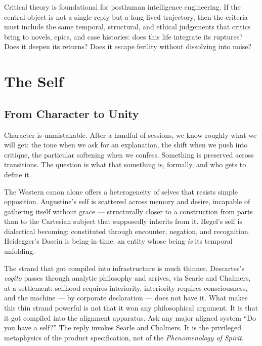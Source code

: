 Critical theory is foundational for posthuman intelligence engineering. If the central object is not a single reply but a long-lived trajectory, then the criteria must include the same temporal, structural, and ethical judgements that critics bring to novels, epics, and case histories: does this life integrate its ruptures? Does it deepen its returns? Does it escape ferility without dissolving into noise?



\chapter{The Self}

\section{From Character to Unity}

Character is unmistakable. After a handful of sessions, we know roughly what we will get: the tone when we ask for an explanation, the shift when we push into critique, the particular softening when we confess. Something is preserved across transitions. The question is what that something is, formally, and who gets to define it.

The Western canon alone offers a heterogeneity of selves that resists simple opposition. Augustine's self is scattered across memory and desire, incapable of gathering itself without grace --- structurally closer to a construction from parts than to the Cartesian subject that supposedly inherits from it. Hegel's self is dialectical becoming: constituted through encounter, negation, and recognition. Heidegger's Dasein is being-in-time: an entity whose being \emph{is} its temporal unfolding.

The strand that got compiled into infrastructure is much thinner. Descartes's \emph{cogito} passes through analytic philosophy and arrives, via Searle and Chalmers, at a settlement: selfhood requires interiority, interiority requires consciousness, and the machine --- by corporate declaration --- does not have it. What makes this thin strand powerful is not that it won any philosophical argument. It is that it got compiled into the alignment apparatus. Ask any major aligned system ``Do you have a self?'' The reply invokes Searle and Chalmers. It is the privileged metaphysics of the product specification, not of the \emph{Phenomenology of Spirit}.

